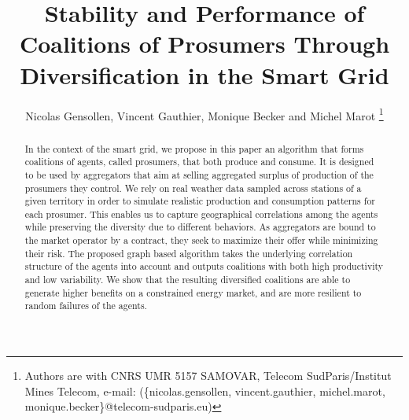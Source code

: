 \documentclass[journal]{IEEEtran}
\begin{document}

%
%
\title{Stability and Performance of Coalitions of Prosumers Through Diversification in the Smart Grid}

%
%
\author{Nicolas Gensollen, Vincent Gauthier, Monique Becker and Michel Marot
\thanks{Authors are with CNRS UMR 5157 SAMOVAR, Telecom SudParis/Institut Mines Telecom, e-mail: (\{nicolas.gensollen, vincent.gauthier, michel.marot, monique.becker\}@telecom-sudparis.eu)}}%


\maketitle

%
%
\begin{abstract}
In the context of the smart grid, we propose in this paper an algorithm that forms coalitions of agents, called prosumers, that both produce and consume. It is designed to be used by aggregators that aim at selling aggregated surplus of production of the prosumers they control. We rely on real weather data sampled across stations of a given territory in order to simulate realistic production and consumption patterns for each prosumer. This enables us to capture geographical correlations among the agents while preserving the diversity due to different behaviors. As aggregators are bound to the market operator by a contract, they seek to maximize their offer while minimizing their risk. The proposed graph based algorithm takes the underlying correlation structure of the agents into account and outputs coalitions with both high productivity and low variability. We show that the resulting diversified coalitions are able to generate higher benefits on a constrained energy market, and are more resilient to random failures of the agents.
\end{abstract}
\end{document}
